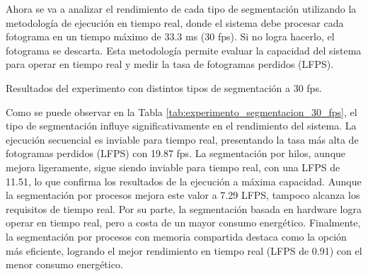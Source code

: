 \documentclass[11pt,spanish,listoffigures,listoftables]{tfgetsinf}
\begin{document}
Ahora se va a analizar el rendimiento de cada tipo de segmentación utilizando la metodología de ejecución en tiempo real, donde el sistema debe procesar cada fotograma en un tiempo máximo de 33.3 ms (30 fps). Si no logra hacerlo, el fotograma se descarta. Esta metodología permite evaluar la capacidad del sistema para operar en tiempo real y medir la tasa de fotogramas perdidos (LFPS).


\begin{table}[H]
   \centering
   \caption{Resultados del experimento con distintos tipos de segmentación a 30 fps.}
   \label{tab:experimento_segmentacion_30_fps}
\end{table}

Como se puede observar en la Tabla \ref{tab:experimento_segmentacion_30_fps}, el tipo de segmentación influye significativamente en el rendimiento del sistema. La ejecución secuencial es inviable para tiempo real, presentando la tasa más alta de fotogramas perdidos (LFPS) con 19.87 fps. La segmentación por hilos, aunque mejora ligeramente, sigue siendo inviable para tiempo real, con una LFPS de 11.51, lo que confirma los resultados de la ejecución a máxima capacidad. Aunque la segmentación por procesos mejora este valor a 7.29 LFPS, tampoco alcanza los requisitos de tiempo real. Por su parte, la segmentación basada en hardware logra operar en tiempo real, pero a costa de un mayor consumo energético. Finalmente, la segmentación por procesos con memoria compartida destaca como la opción más eficiente, logrando el mejor rendimiento en tiempo real (LFPS de 0.91) con el menor consumo energético.
\end{document}
